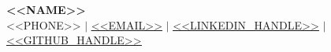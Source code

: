 \begin{center}
    \textbf{\Huge \scshape <<NAME>>} \\ \vspace{1pt}
    \small <<PHONE>> $|$ \href{mailto:<<EMAIL>>}{\underline{<<EMAIL>>}} $|$ 
    \href{<<LINKEDIN_URL>>}{\underline{<<LINKEDIN_HANDLE>>}} $|$
    \href{<<GITHUB_URL>>}{\underline{<<GITHUB_HANDLE>>}}
\end{center} 